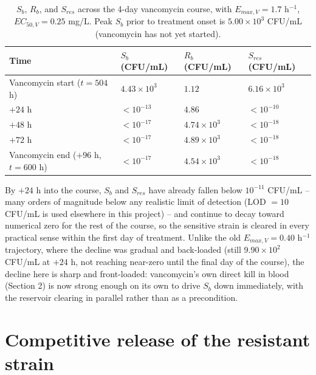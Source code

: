 \documentclass[11pt]{article}
\begin{document}
\begin{table}[H]
\centering
\large %
\renewcommand{\arraystretch}{1.35} %
\caption{$S_b$, $R_b$, and $S_{res}$ across the 4-day vancomycin course,
with $E_{max,V} = 1.7$ h$^{-1}$, $EC_{50,V} = 0.25$ mg/L. Peak $S_b$ prior
to treatment onset is $5.00\times10^{3}$ CFU/mL (vancomycin
has not yet started).}
\vspace{0.5cm} %
\begin{tabular}{l l l l}  %
\hline
\textbf{Time} & \textbf{$S_b$ (CFU/mL)} & \textbf{$R_b$ (CFU/mL)} & \textbf{$S_{res}$ (CFU/mL)} \\
\hline
Vancomycin start ($t=504$ h) & $4.43\times10^{3}$ & $1.12$ & $6.16\times10^{3}$ \\
$+24$ h & $<10^{-13}$ & $4.86$ & $<10^{-10}$ \\
$+48$ h & $<10^{-17}$ & $4.74\times10^{3}$ & $<10^{-18}$ \\
$+72$ h & $<10^{-17}$ & $4.89\times10^{3}$ & $<10^{-18}$ \\
Vancomycin end ($+96$ h, $t=600$ h) & $<10^{-17}$ & $4.54\times10^{3}$ & $<10^{-18}$ \\
\hline
\end{tabular}
\label{tab:sb}
\end{table}

By $+24$ h into the course, $S_b$ and $S_{res}$ have already fallen below
$10^{-11}$ CFU/mL -- many orders of magnitude below any realistic limit of
detection (LOD $=10$ CFU/mL is used elsewhere in this project) -- and
continue to decay toward numerical zero for the rest of the course, so the
sensitive strain is cleared in every practical sense within the first day
of treatment. Unlike the old $E_{max,V} = 0.40$ h$^{-1}$ trajectory, where
the decline was gradual and back-loaded (still $9.90\times10^{2}$ CFU/mL at
$+24$ h, not reaching near-zero until the final day of the course), the
decline here is sharp and front-loaded: vancomycin's own direct kill in
blood (Section 2) is now strong enough on its own to drive $S_b$ down
immediately, with the reservoir clearing in parallel rather than as a
precondition.

\section{Competitive release of the resistant strain}
\end{document}
